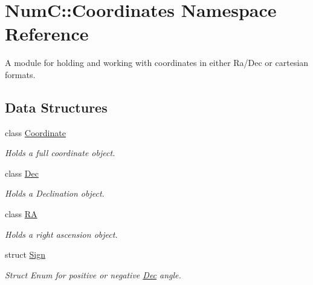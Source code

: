 \hypertarget{namespace_num_c_1_1_coordinates}{}\section{NumC\+:\+:Coordinates Namespace Reference}
\label{namespace_num_c_1_1_coordinates}


A module for holding and working with coordinates in either Ra/\+Dec or cartesian formats.  


\subsection*{Data Structures}
\begin{DoxyCompactItemize}
\item 
class \mbox{\hyperlink{class_num_c_1_1_coordinates_1_1_coordinate}{Coordinate}}
\begin{DoxyCompactList}\small\item\em Holds a full coordinate object. \end{DoxyCompactList}\item 
class \mbox{\hyperlink{class_num_c_1_1_coordinates_1_1_dec}{Dec}}
\begin{DoxyCompactList}\small\item\em Holds a Declination object. \end{DoxyCompactList}\item 
class \mbox{\hyperlink{class_num_c_1_1_coordinates_1_1_r_a}{RA}}
\begin{DoxyCompactList}\small\item\em Holds a right ascension object. \end{DoxyCompactList}\item 
struct \mbox{\hyperlink{struct_num_c_1_1_coordinates_1_1_sign}{Sign}}
\begin{DoxyCompactList}\small\item\em Struct Enum for positive or negative \mbox{\hyperlink{class_num_c_1_1_coordinates_1_1_dec}{Dec}} angle. \end{DoxyCompactList}\end{DoxyCompactItemize}
